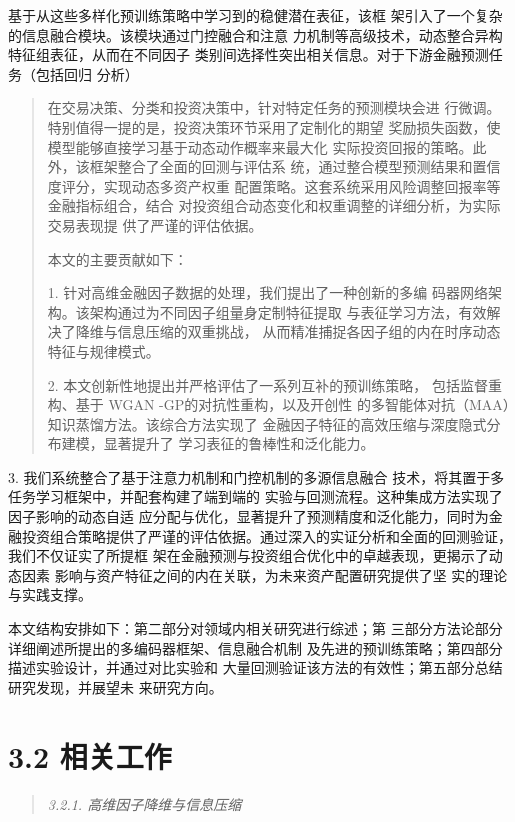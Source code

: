 \documentclass[UTF8]{ctexart}
\begin{document}
基于从这些多样化预训练策略中学习到的稳健潜在表征，该框
架引入了一个复杂的信息融合模块。该模块通过门控融合和注意
力机制等高级技术，动态整合异构特征组表征，从而在不同因子
类别间选择性突出相关信息。对于下游金融预测任务（包括回归 分析）

\begin{quote}
在交易决策、分类和投资决策中，针对特定任务的预测模块会进
行微调。特别值得一提的是，投资决策环节采用了定制化的期望
奖励损失函数，使模型能够直接学习基于动态动作概率来最大化
实际投资回报的策略。此外，该框架整合了全面的回测与评估系
统，通过整合模型预测结果和置信度评分，实现动态多资产权重
配置策略。这套系统采用风险调整回报率等金融指标组合，结合
对投资组合动态变化和权重调整的详细分析，为实际交易表现提
供了严谨的评估依据。

本文的主要贡献如下：

1. 针对高维金融因子数据的处理，我们提出了一种创新的多编
码器网络架构。该架构通过为不同因子组量身定制特征提取
与表征学习方法，有效解决了降维与信息压缩的双重挑战，
从而精准捕捉各因子组的内在时序动态特征与规律模式。

2. 本文创新性地提出并严格评估了一系列互补的预训练策略，
包括监督重构、基于 WGAN -GP的对抗性重构，以及开创性
的多智能体对抗（MAA）知识蒸馏方法。该综合方法实现了
金融因子特征的高效压缩与深度隐式分布建模，显著提升了
学习表征的鲁棒性和泛化能力。
\end{quote}

3. 我们系统整合了基于注意力机制和门控机制的多源信息融合
技术，将其置于多任务学习框架中，并配套构建了端到端的
实验与回测流程。这种集成方法实现了因子影响的动态自适
应分配与优化，显著提升了预测精度和泛化能力，同时为金
融投资组合策略提供了严谨的评估依据。通过深入的实证分析和全面的回测验证，我们不仅证实了所提框
架在金融预测与投资组合优化中的卓越表现，更揭示了动态因素
影响与资产特征之间的内在关联，为未来资产配置研究提供了坚
实的理论与实践支撑。

本文结构安排如下：第二部分对领域内相关研究进行综述；第
三部分方法论部分详细阐述所提出的多编码器框架、信息融合机制
及先进的预训练策略；第四部分描述实验设计，并通过对比实验和
大量回测验证该方法的有效性；第五部分总结研究发现，并展望未 来研究方向。

\section{3.2 相关工作}\label{ux76f8ux5173ux5de5ux4f5c}

\begin{quote}
\emph{3.2.1. 高维因子降维与信息压缩}
\end{quote}
\end{document}
